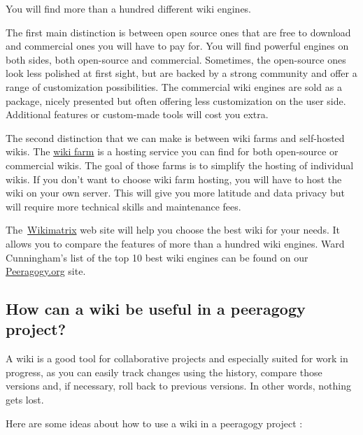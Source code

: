 You will find more than a hundred different wiki engines.

The first main distinction is between open source ones that are free to
download and commercial ones you will have to pay for. You will find
powerful engines on both sides, both open-source and commercial.
Sometimes, the open-source ones look less polished at first sight, but
are backed by a strong community and offer a range of customization
possibilities. The commercial wiki engines are sold as a package, nicely
presented but often offering less customization on the user side.
Additional features or custom-made tools will cost you extra.

The second distinction that we can make is between wiki farms and
self-hosted wikis. The
\href{http://en.wikipedia.org/wiki/Wiki_hosting_service}{wiki farm} is a
hosting service you can find for both open-source or commercial wikis.
The goal of those farms is to simplify the hosting of individual wikis.
If you don't want to choose wiki farm hosting, you will have to host the
wiki on your own server. This will give you more latitude and data
privacy but will require more technical skills and maintenance fees.

The~\href{http://www.wikimatrix.org/}{Wikimatrix} web site will help you
choose the best wiki for your needs. It allows you to compare the
features of more than a hundred wiki engines. Ward Cunningham's list of
the top 10 best wiki engines can be found on our
\href{http://c2.com/cgi/wiki?TopTenWikiEngines}{Peeragogy.org} site.

\subsection{How can a wiki be useful in a peeragogy
project?}\label{how-can-a-wiki-be-useful-in-a-peeragogy-project}

A wiki is a good tool for collaborative projects and especially suited
for work in progress, as you can easily track changes using the history,
compare those versions and, if necessary, roll back to previous
versions. In other words, nothing gets lost.

Here are some ideas about how to use a wiki in a peeragogy project :

